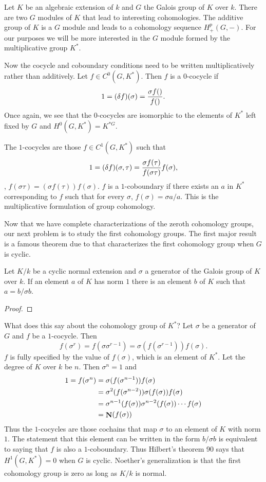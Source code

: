 Let $K$ be an algebraic extension of $k$ and $G$ the Galois group of
$K$ over $k$.  There are two $G$ modules of $K$ that lead to
interesting cohomologies.  The additive group of $K$ is a $G$ module
and leads to a cohomology sequence $H^p_{+}(G, -)$.  For our purposes
we will be more interested in the $G$ module formed by the
multiplicative group $K^{\ast}$.

Now the cocycle and coboundary conditions need to be written
multiplicatively rather than additively.  Let $f \in C^0(G,
K^{\ast})$.  Then $f$ is a $0$-cocycle if
\[
1 = (\delta f)(\sigma) = {\sigma f() \over f()}.
\]
Once again, we see that the $0$-cocycles are isomorphic to the elements
of $K^{\ast}$ left fixed by $G$ and $H^0(G, K^{\ast}) = K^{\ast G}$.

The $1$-cocycles are those 
$f \in C^1(G, K^{\ast})$ such that
\[
1 = (\delta f)(\sigma, \tau) 
    = {\sigma f(\tau) \over f(\sigma\tau)} f(\sigma),
\]
\ie, $f(\sigma\tau) = (\sigma f(\tau)) f(\sigma).$
$f$ is a $1$-coboundary if there exists an $a$ in $K^{\ast}$
corresponding to $f$ such that for every $\sigma$, $f(\sigma) = \sigma a / a$.
This is the multiplicative formulation of group cohomology.

Now that we have complete characterizations of the zeroth cohomology
groups, our next problem is to study the first cohomology groups.  The
first major result is a famous theorem due to {\Hilbert}
\cite{Hilbert:ANT} that characterizes the first cohomology group when
$G$ is cyclic.

\begin{proposition}
\label{Hilbert:Ninety:Prop}
Let $K/k$ be a cyclic normal extension and $\sigma$ a generator of the
Galois group of $K$ over $k$.  If an element $a$ of $K$ has norm $1$
there is an element $b$ of $K$ such that $a= b/\sigma b$.
\end{proposition}

\begin{proof}
\end{proof}

What does this say about the cohomology group of $K^{\ast}$?
Let $\sigma$ be a generator of $G$ and $f$ be a $1$-cocycle.  Then
\[
f(\sigma^r) = f(\sigma \sigma^{r-1}) = \sigma(f(\sigma^{r-1}))
f(\sigma).
\]
$f$ is fully specified by the value of $f(\sigma)$, which is an element
of $K^{\ast}$.  Let the degree of $K$ over $k$ be $n$.  Then 
$\sigma^n = 1$ and
\[
\begin{aligned}
1 = f(\sigma^n) &= \sigma(f(\sigma^{n-1})) f(\sigma) \\
&= \sigma^2(f(\sigma^{n-2})) \sigma(f(\sigma)) f(\sigma) \\
& = \sigma^{n-1}(f(\sigma)) \sigma^{n-2}(f(\sigma)) \cdots f(\sigma)\\
& = \mathop{\mathbf{N}}\nolimits(f(\sigma))
\end{aligned}
\]
Thus the $1$-cocycles are those cochains that map $\sigma$ to an element
of $K$ with norm $1$.  The statement that this element can be written in
the form $b / \sigma b$ is equivalent to saying that $f$ is also a
$1$-coboundary.  Thus Hilbert's theorem 90 says that $H^1(G, K^{\ast}) =
0$ when $G$ is cyclic.  Noether's generalization is that the first
cohomology group is zero as long as $K/k$ is normal.


